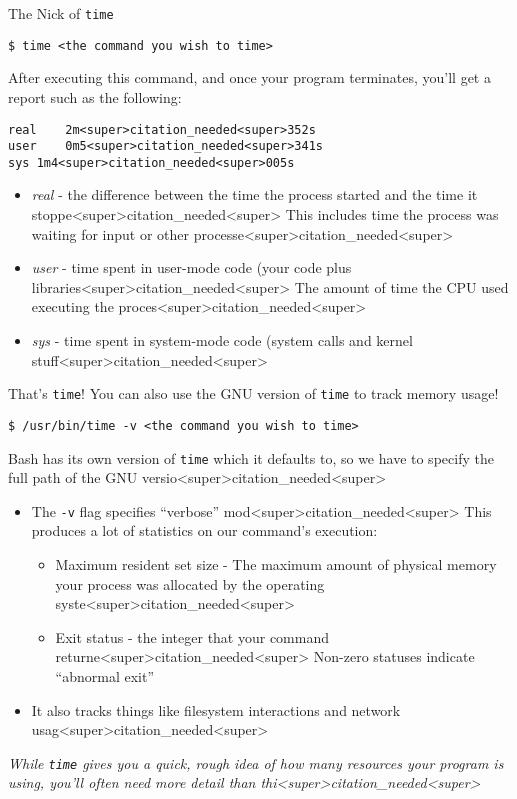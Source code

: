 \documentclass[11pt]{beamer}
\begin{document}
\begin{frame}[fragile=singleslide]{The Nick of \texttt{time}}
\begin{lstlisting}[style=terminal]
$ time <the command you wish to time>
\end{lstlisting}
After executing this command, and once your program terminates, you'll get a report such as the following:
\begin{lstlisting}[style=terminal]
real	2m<super>citation_needed<super>352s
user	0m5<super>citation_needed<super>341s
sys	1m4<super>citation_needed<super>005s
\end{lstlisting}
\begin{itemize}
\item \textit{real} - the difference between the time the process started and the time it stoppe<super>citation_needed<super>  This includes time the process was waiting for input or other processe<super>citation_needed<super>
\item \textit{user} - time spent in user-mode code (your code plus libraries<super>citation_needed<super>  The amount of time the CPU used executing the proces<super>citation_needed<super>  
\item \textit{sys} - time spent in system-mode code (system calls and kernel stuff<super>citation_needed<super> 
\end{itemize}
\end{frame}

\begin{frame}[fragile=singleslide]{That's \texttt{time}!}
You can also use the GNU version of \texttt{time} to track memory usage! 
\begin{lstlisting}[style=terminal]
$ /usr/bin/time -v <the command you wish to time>
\end{lstlisting}
Bash has its own version of \texttt{time} which it defaults to, so we have to specify the full path of the GNU versio<super>citation_needed<super>  
\begin{itemize}
\item The \texttt{-v} flag specifies ``verbose'' mod<super>citation_needed<super> This produces a lot of statistics on our command's execution:
\begin{itemize}
\item Maximum resident set size - The maximum amount of physical memory your process was allocated by the operating syste<super>citation_needed<super>  
\item Exit status - the integer that your command returne<super>citation_needed<super>  Non-zero statuses indicate ``abnormal exit''
\end{itemize}
\item It also tracks things like filesystem interactions and network usag<super>citation_needed<super>  
\end{itemize}

\center
\emph{While \texttt{time} gives you a quick, rough idea of how many resources your program is using, you'll often need more detail than thi<super>citation_needed<super>}
\end{frame}
\end{document}
